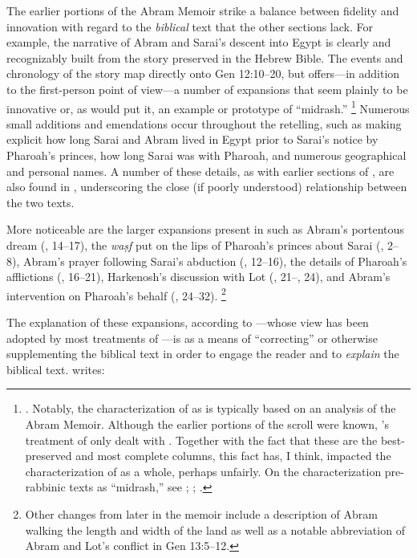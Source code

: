 The earlier portions of the Abram Memoir strike a balance between fidelity and innovation with regard to the \emph{biblical} text that the other sections lack. For example, the narrative of Abram and Sarai's descent into Egypt is clearly and recognizably built from the story preserved in the Hebrew Bible. The events and chronology of the story map directly onto Gen 12:10--20, but \ga offers---in addition to the first-person point of view---a number of expansions that seem plainly to be innovative or, as \vermes would put it, an example or prototype of ``midrash.''%
    \footnote{\Cite[124]{vermes1961}. Notably, the characterization of \ga as \rwb is typically based on an analysis of the Abram Memoir. Although the earlier portions of the scroll were known, \vermes's treatment of \ga only dealt with . Together with the fact that these are the best-preserved and most complete columns, this fact has, I think, impacted the characterization of \ga as a whole, perhaps unfairly. On the characterization pre-rabbinic texts as ``midrash,'' see \cite[esp. 298--305]{mandel2017}; \cite{mandel_dsd2001}; \cite{mandel_bakhos2006}.}
Numerous small additions and emendations occur throughout the retelling, such as making explicit how long Sarai and Abram lived in Egypt prior to Sarai's notice by Pharoah's princes, how long Sarai was with Pharoah, and numerous geographical and personal names. A number of these details, as with earlier sections of \ga, are also found in \jub, underscoring the close (if poorly understood) relationship between the two texts.

More noticeable are the larger expansions present in \ga such as Abram's portentous dream (, 14--17), the \emph{waṣf} put on the lips of Pharoah's princes about Sarai (, 2--8), Abram's prayer following Sarai's abduction (, 12--16), the details of Pharoah's afflictions (, 16--21), Harkenosh's discussion with Lot (, 21--, 24), and Abram's intervention on Pharoah's behalf (, 24--32).%
    \footnote{Other changes from later in the memoir include a description of Abram walking the length and width of the land as well as a notable abbreviation of Abram and Lot's conflict in Gen 13:5--12.}

The explanation of these expansions, according to \vermes---whose view has been adopted by most treatments of \ga---is as a means of ``correcting'' or otherwise supplementing the biblical text in order to engage the reader and to \emph{explain} the biblical text.%
    \autocite[126]{vermes1961}
\vermes writes:

